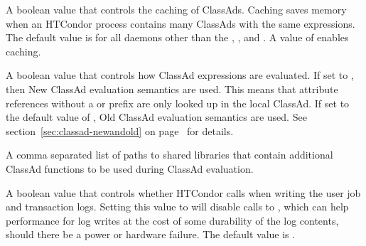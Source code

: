 \begin{description}
\label{param:EnableClassadCaching}
\item[\Macro{ENABLE\_CLASSAD\_CACHING}]
  A boolean value that controls the caching of ClassAds.
  Caching saves memory when an HTCondor process contains
  many ClassAds with the same expressions.
  The default value is  for all daemons other than the
  , , and .
  A value of  enables caching.

\label{param:StrictClassadEvaluation}
\item[\Macro{STRICT\_CLASSAD\_EVALUATION}]
  A boolean value that controls how ClassAd expressions are evaluated. 
  If set to , then New ClassAd evaluation semantics are used.
  This means that attribute references without a  or
   prefix are only looked up in the local ClassAd.
  If set to the default value of , 
  Old ClassAd evaluation semantics are used.
  See section~\ref{sec:classad-newandold}  on
  page~\pageref{sec:classad-newandold} for details.

\label{param:ClassadUserLibs}
\item[\Macro{CLASSAD\_USER\_LIBS}]
  A comma separated list of paths to shared libraries that contain
  additional ClassAd functions to be used during ClassAd evaluation.
  
\label{param:CondorFsync}
\item[\Macro{CONDOR\_FSYNC}]
  A boolean value that controls whether HTCondor calls  when
  writing the user job and transaction logs.  
  Setting this value to 
  will disable calls to , 
  which can help performance for 
  log writes at the cost of some durability of the log contents,
  should there be a power or hardware failure.  
  The default value is .


\end{description}
